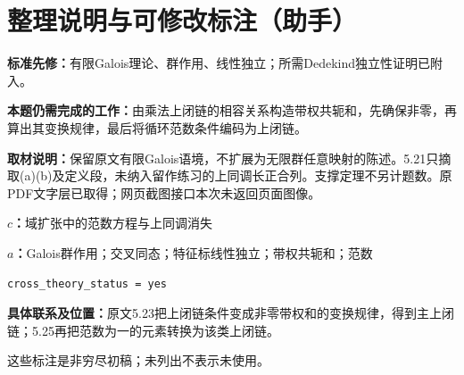 \documentclass[UTF8,11pt,a4paper]{ctexart}
\theoremstyle{definition}\newtheorem*{definition}{Definition}
\theoremstyle{remark}\newtheorem*{remark}{Remark}
\begin{document}
\section*{整理说明与可修改标注（助手）}
\textbf{标准先修：}有限Galois理论、群作用、线性独立；所需Dedekind独立性证明已附入。

\textbf{本题仍需完成的工作：}由乘法上闭链的相容关系构造带权共轭和，先确保非零，再算出其变换规律，最后将循环范数条件编码为上闭链。

\textbf{取材说明：}保留原文有限Galois语境，不扩展为无限群任意映射的陈述。5.21只摘取(a)(b)及定义段，未纳入留作练习的上同调长正合列。支撑定理不另计题数。原PDF文字层已取得；网页截图接口本次未返回页面图像。

\textbf{$c$：}域扩张中的范数方程与上同调消失

\textbf{$a$：}Galois群作用；交叉同态；特征标线性独立；带权共轭和；范数

\texttt{cross\_theory\_status = yes}

\textbf{具体联系及位置：}原文5.23把上闭链条件变成非零带权和的变换规律，得到主上闭链；5.25再把范数为一的元素转换为该类上闭链。

这些标注是非穷尽初稿；未列出不表示未使用。
\end{document}
